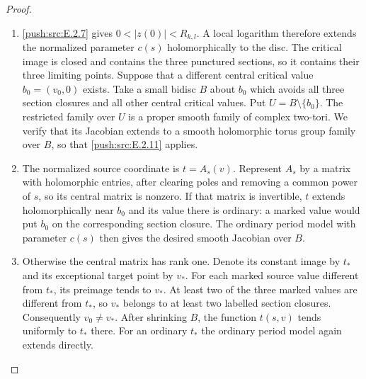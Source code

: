 \begin{proof}

\begin{enumerate}[label={$\langle1\rangle$\arabic*.},leftmargin=*]
\item \ref{push:src:E.2.7} gives $0<|z(0)|<R_{k,l}$.  A local logarithm
therefore extends the normalized parameter $c(s)$
holomorphically to the disc.  The critical image is closed
and contains the three punctured sections, so it contains
their three limiting points.  Suppose that a different
central critical value $b_0=(v_0,0)$ exists.  Take a small
bidisc $B$ about $b_0$ which avoids all three section
closures and all other central critical values.  Put
$U=B\setminus\{b_0\}$.  The restricted family over $U$
is a proper smooth family of complex two-tori.  We verify
that its Jacobian extends to a smooth holomorphic torus
group family over $B$, so that \ref{push:src:E.2.11} applies.

\item The normalized source coordinate is $t=A_s(v)$.
Represent $A_s$ by a matrix with holomorphic entries,
after clearing poles and removing a common power of
$s$, so its central matrix is nonzero.  If that matrix
is invertible, $t$ extends holomorphically near $b_0$ and
its value there is ordinary: a marked value would put
$b_0$ on the corresponding section closure.  The
ordinary period model with parameter $c(s)$ then gives
the desired smooth Jacobian over $B$.

\item Otherwise the central matrix has rank one.  Denote its
constant image by $t_*$ and its exceptional target point
by $v_*$.  For each marked source value different from
$t_*$, its preimage tends to $v_*$.  At least two of the
three marked values are different from $t_*$, so $v_*$
belongs to at least two labelled section closures.
Consequently $v_0\ne v_*$.  After shrinking $B$, the
function $t(s,v)$ tends uniformly to $t_*$ there.
For an ordinary $t_*$ the ordinary period model again
extends directly.


\end{enumerate}
\end{proof}
